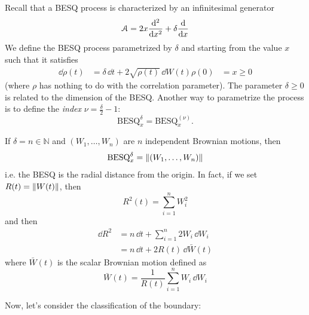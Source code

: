  Recall that a BESQ process is characterized by an infinitesimal generator
\begin{equation}
    \mathcal{A} = 2x\dv[2]{}{x} + \delta\dv{}{x}
\end{equation}
We define the BESQ process parametrized by $\delta$ and starting from the value $x$ such that it satisfies
\begin{align}
    \dd\rho(t) &= \delta\,\dd t + 2\sqrt{\rho(t)}\,\dd W(t)
    \rho(0) &= x \ge 0
\end{align}
(where $\rho$ has nothing to do with the correlation parameter). The parameter $\delta\ge 0$ is related to the dimension of the BESQ. Another way to parametrize the process is to define the \emph{index} $\nu = \tfrac{\delta}{2}-1$:
\begin{equation*}
    \text{BESQ}^{\delta}_x = \text{BESQ}^{(\nu)}_x.
\end{equation*}
\begin{remark}
    If $\delta = n \in \mathbb{N}$ and $(W_1,\dots,W_n)$ are $n$ independent Brownian motions, then
    \begin{equation*}
        \text{BESQ}^{\delta}_x = \norm{(W_1,\dots,W_n)}
    \end{equation*}
    i.e. the BESQ is the radial distance from the origin. In fact, if we set $R(t) = \norm{W(t)}$, then
    \begin{equation*}
        R^2(t) = \sum_{i=1}^n W_i^2
    \end{equation*}
    and then
    \begin{align*}
        \dd R^2 &= n\,\dd t + \sum_{i=1}^n 2W_i\,\dd W_i \\
        &=
        n\,\dd t + 2R(t)\,\dd\bar{W}(t)
    \end{align*}
    where $\bar{W}(t)$ is the scalar Brownian motion defined as
    \begin{equation*}
        \bar{W}(t) = \frac{1}{R(t)}\sum_{i=1}^n W_i\,\dd W_i
    \end{equation*}
\end{remark} %
Now, let's consider the classification of the boundary:
